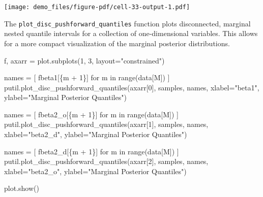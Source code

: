 \documentclass[
  letterpaper,
  DIV=11,
  numbers=noendperiod]{scrartcl}
\newenvironment{Shaded}{\begin{snugshade}}{\end{snugshade}}
\newcommand{\BuiltInTok}[1]{\textcolor[rgb]{0.00,0.23,0.31}{#1}}
\newcommand{\ControlFlowTok}[1]{\textcolor[rgb]{0.00,0.23,0.31}{#1}}
\newcommand{\DecValTok}[1]{\textcolor[rgb]{0.68,0.00,0.00}{#1}}
\newcommand{\KeywordTok}[1]{\textcolor[rgb]{0.00,0.23,0.31}{#1}}
\newcommand{\NormalTok}[1]{\textcolor[rgb]{0.00,0.23,0.31}{#1}}
\newcommand{\OperatorTok}[1]{\textcolor[rgb]{0.37,0.37,0.37}{#1}}
\newcommand{\SpecialCharTok}[1]{\textcolor[rgb]{0.37,0.37,0.37}{#1}}
\newcommand{\SpecialStringTok}[1]{\textcolor[rgb]{0.13,0.47,0.30}{#1}}
\newcommand{\StringTok}[1]{\textcolor[rgb]{0.13,0.47,0.30}{#1}}
\begin{document}
\texttt{[image: demo\_files/figure-pdf/cell-33-output-1.pdf]}

The \texttt{plot\_disc\_pushforward\_quantiles} function plots
disconnected, marginal nested quantile intervals for a collection of
one-dimensional variables. This allows for a more compact visualization
of the marginal posterior distributions.

\begin{Shaded}
\begin{Highlighting}[]
\NormalTok{f, axarr }\OperatorTok{=}\NormalTok{ plot.subplots(}\DecValTok{1}\NormalTok{, }\DecValTok{3}\NormalTok{, layout}\OperatorTok{=}\StringTok{"constrained"}\NormalTok{)}

\NormalTok{names }\OperatorTok{=}\NormalTok{ [ }\SpecialStringTok{f\textquotesingle{}beta1[}\SpecialCharTok{\{}\NormalTok{m }\OperatorTok{+} \DecValTok{1}\SpecialCharTok{\}}\SpecialStringTok{]\textquotesingle{}} \ControlFlowTok{for}\NormalTok{ m }\KeywordTok{in} \BuiltInTok{range}\NormalTok{(data[}\StringTok{\textquotesingle{}M\textquotesingle{}}\NormalTok{]) ]}
\NormalTok{putil.plot\_disc\_pushforward\_quantiles(axarr[}\DecValTok{0}\NormalTok{], samples, names,}
\NormalTok{                                      xlabel}\OperatorTok{=}\StringTok{"beta1"}\NormalTok{,}
\NormalTok{                                      ylabel}\OperatorTok{=}\StringTok{"Marginal Posterior Quantiles"}\NormalTok{)}

\NormalTok{names }\OperatorTok{=}\NormalTok{ [ }\SpecialStringTok{f\textquotesingle{}beta2\_o[}\SpecialCharTok{\{}\NormalTok{m }\OperatorTok{+} \DecValTok{1}\SpecialCharTok{\}}\SpecialStringTok{]\textquotesingle{}} \ControlFlowTok{for}\NormalTok{ m }\KeywordTok{in} \BuiltInTok{range}\NormalTok{(data[}\StringTok{\textquotesingle{}M\textquotesingle{}}\NormalTok{]) ]}
\NormalTok{putil.plot\_disc\_pushforward\_quantiles(axarr[}\DecValTok{1}\NormalTok{], samples, names,}
\NormalTok{                                      xlabel}\OperatorTok{=}\StringTok{"beta2\_d"}\NormalTok{,}
\NormalTok{                                      ylabel}\OperatorTok{=}\StringTok{"Marginal Posterior Quantiles"}\NormalTok{)}

\NormalTok{names }\OperatorTok{=}\NormalTok{ [ }\SpecialStringTok{f\textquotesingle{}beta2\_d[}\SpecialCharTok{\{}\NormalTok{m }\OperatorTok{+} \DecValTok{1}\SpecialCharTok{\}}\SpecialStringTok{]\textquotesingle{}} \ControlFlowTok{for}\NormalTok{ m }\KeywordTok{in} \BuiltInTok{range}\NormalTok{(data[}\StringTok{\textquotesingle{}M\textquotesingle{}}\NormalTok{]) ]}
\NormalTok{putil.plot\_disc\_pushforward\_quantiles(axarr[}\DecValTok{2}\NormalTok{], samples, names,}
\NormalTok{                                      xlabel}\OperatorTok{=}\StringTok{"beta2\_o"}\NormalTok{,}
\NormalTok{                                      ylabel}\OperatorTok{=}\StringTok{"Marginal Posterior Quantiles"}\NormalTok{)}

\NormalTok{plot.show()}
\end{Highlighting}
\end{Shaded}
\end{document}
